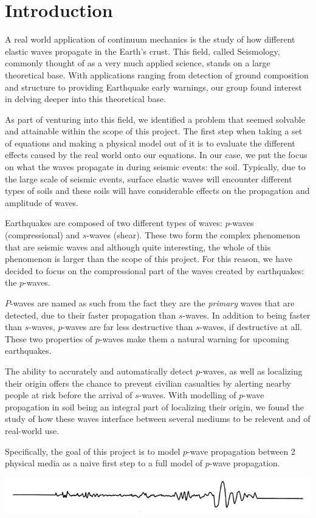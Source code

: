 \chapter{Introduction}

A real world application of continuum mechanics is the study of how different elastic waves propagate in the Earth's crust. This field, called Seismology, commonly thought of as a very much applied science, stands on a large theoretical base. With applications ranging from detection of ground composition and structure\cite{https://doi.org/10.1029/95JB00259} to providing Earthquake early warnings\cite{government_of_canada_2019}, our group found interest in delving deeper into this theoretical base.

As part of venturing into this field, we identified a problem that seemed solvable and attainable within the scope of this project. The first step when taking a set of equations and making a physical model out of it is to evaluate the different effects caused by the real world onto our equations. In our case, we put the focus on what the waves propagate in during seismic events: the soil. Typically, due to the large scale of seismic events, surface elastic waves will encounter different types of soils and these soils will have considerable effects on the propagation and amplitude of waves.

Earthquakes are composed of two different types of waves: $p$-waves (compressional) and $s$-waves (shear). These two form the complex phenomenon that are seismic waves and although quite interesting, the whole of this phenomenon is larger than the scope of this project. For this reason, we have decided to focus on the compressional part of the waves created by earthquakes: the $p$-waves.

$P$-waves are named as such from the fact they are the \textit{primary} waves that are detected, due to their faster propagation than $s$-waves. In addition to being faster than $s$-waves, $p$-waves are far less destructive than $s$-waves, if destructive at all. These two properties of $p$-waves make them a natural warning for upcoming earthquakes.

The ability to accurately and automatically detect $p$-waves, as well as localizing their origin offers the chance to prevent civilian casualties by alerting nearby people at risk before the arrival of $s$-waves. With modelling of $p$-wave propagation in soil being an integral part of localizing their origin, we found the study of how these waves interface between several mediums to be relevent and of real-world use.

Specifically, the goal of this project is to model $p$-wave propagation between 2 physical media as a naive first step to a full model of $p$-wave propagation.

\begin{center}
    \includegraphics[width=\linewidth]{assets/trace.png}
\end{center}